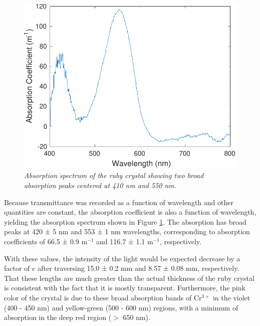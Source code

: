 \documentclass[11pt, a4paper, twocolumn]{article}
\begin{document}
\begin{figure}[H]
\includegraphics[width=\linewidth]{absorptionSpectrumFocused.pdf}
\caption{\textit{Absorption spectrum of the ruby crystal showing two broad absorption peaks centered at 410 nm and 550 nm.}}
\label{fig:absorptionSpectrumFocused}
\end{figure}



Because transmittance was recorded as a function of wavelength and other quantities are constant, the absorption coefficient is also a function of wavelength, yielding the absorption spectrum shown in Figure \ref{fig:absorptionSpectrumFocused}. The absorption has broad peaks at 420 ± 5 nm and 553 ± 1 nm wavelengths, corresponding to absorption coefficients of 66.5 ± 0.9 m$^{-1}$ and 116.7 ± 1.1 m$^{-1}$, respectively. 

With these values, the intensity of the light would be expected decrease by a factor of $e$ after traversing 15.0 ± 0.2 mm and 8.57 ± 0.08 mm, respectively. That these lengths are much greater than the actual thickness of the ruby crystal is consistent with the fact that it is mostly transparent. Furthermore, the pink color of the crystal is due to these broad absorption bands of Cr$^{3+}$ in the violet (400 - 450 nm) and yellow-green (500 - 600 nm) regions, with a minimum of absorption in the deep red region ($>$ 650 nm).
\end{document}
